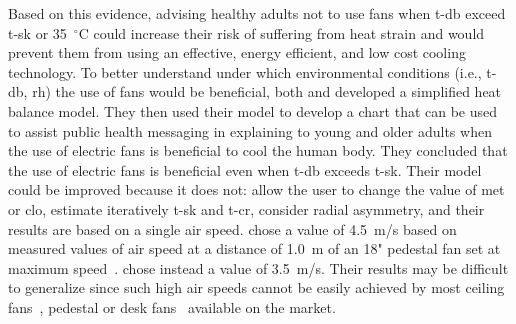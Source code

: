 Based on this evidence, advising healthy adults not to use fans when \ac{t-db} exceed \ac{t-sk} or 35~$^{\circ}$C could increase their risk of suffering from heat strain and would prevent them from using an effective, energy efficient, and low cost cooling technology.
To better understand under which environmental conditions (i.e., \ac{t-db}, \ac{rh}) the use of fans would be beneficial, both  and  developed a simplified heat balance model.
They then used their model to develop a chart that can be used to assist public health messaging in explaining to young and older adults when the use of electric fans is beneficial to cool the human body.
They concluded that the use of electric fans is beneficial even when \ac{t-db} exceeds \ac{t-sk}.
Their model could be improved because it does not: allow the user to change the value of \ac{met} or \ac{clo}, estimate iteratively \ac{t-sk} and \ac{t-cr}, consider radial asymmetry, and their results are based on a single air speed.
 chose a value of 4.5~m/s based on measured values of air speed at a distance of 1.0~m of an 18" pedestal fan set at maximum speed~\cite{Jay2015}.
 chose instead a value of 3.5~m/s.
Their results may be difficult to generalize since such high air speeds cannot be easily achieved by most ceiling fans~\cite{Raftery2019}, pedestal or desk fans~\cite{Yang2015a} available on the market.

